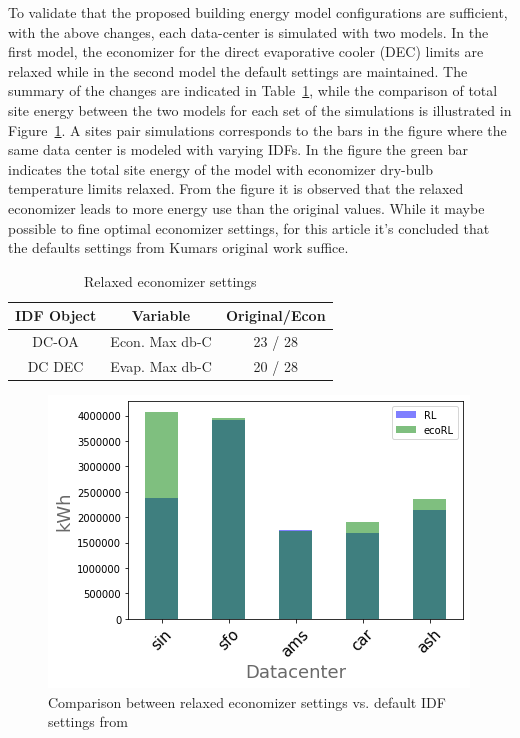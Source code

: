 \documentclass[twocolumn, a4paper,10pt]{article}
\begin{document}
To validate that the proposed building energy model configurations are sufficient, with the above changes, each data-center is simulated with two models. In the first model, the economizer for the direct evaporative cooler (DEC) limits are relaxed while in the second model the default settings are maintained. The summary of the changes are indicated in Table~\ref{table:tab01}, while the comparison of total site energy between the two models for each set of the simulations is illustrated in Figure~\ref{fig:total_energy_comp}. A site\textsc{}s pair simulations corresponds to the bars in the figure where the same data center is modeled with varying IDFs. In the figure the green bar indicates the total site energy of the model with economizer dry-bulb temperature limits relaxed. From the figure it is observed that the relaxed economizer leads to more energy use than the original values. While it maybe possible to fine optimal economizer settings, for this article it's concluded that the defaults settings from Kumar\textsc{}s original work suffice. 

  
  \begin{table}[ht]
    \vspace{-10 pt}
    \caption{Relaxed economizer settings}
    \label{table:tab01}
    \centering
    \begin{tabular}{| c | c | c | }
      \hline
      \bf{IDF Object} & \bf{Variable} & \bf{Original/Econ} \\
      \hline
      DC-OA & Econ. Max db-C & 23 / 28 \\
      \hline
      DC DEC & Evap. Max db-C & 20 / 28 \\
      \hline
    \end{tabular}
    \vspace{-8 pt}   %
    \end{table}

  \begin{figure}
    \centering
    \includegraphics[scale=.45]{img/total_energy_comp.png}
    \caption{Comparison between relaxed economizer settings  vs. default IDF settings from \citep{kumar20} }
    \label{fig:total_energy_comp}
    \end{figure}
\end{document}
